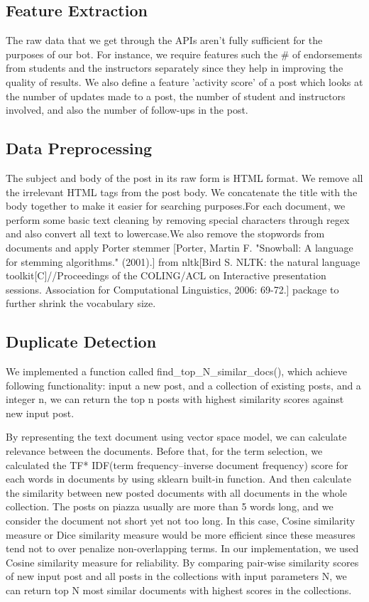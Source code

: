 \documentclass[sigconf]{acmart}
\begin{document}
\subsection{Feature Extraction}
The raw data that we get through the APIs aren't fully sufficient for the purposes of our bot. For instance, we require features such the \# of endorsements from students and the instructors separately since they help in improving the quality of results. We also define a feature 'activity score' of a post which looks at the number of updates made to a post, the number of student and instructors involved, and also the number of follow-ups in the post.


\subsection{Data Preprocessing}
The subject and body of the post in its raw form is HTML format. We remove all the irrelevant HTML tags from the post body. We concatenate the title with the body together to make it easier for searching purposes.For each document, we perform some basic text cleaning by removing special characters through regex and also convert all text to lowercase.We also remove the stopwords from documents and apply Porter stemmer [Porter, Martin F. "Snowball: A language for stemming algorithms." (2001).] from nltk[Bird S. NLTK: the natural language toolkit[C]//Proceedings of the COLING/ACL on Interactive presentation sessions. Association for Computational Linguistics, 2006: 69-72.] package to further shrink the vocabulary size. 

\subsection{Duplicate Detection}
We implemented a function called find\_top\_N\_similar\_docs(), which achieve following functionality: input a new post, and a collection of existing posts, and a integer n, we can return the top n posts with highest similarity scores against new input post. 

By representing the text document using vector space model, we can calculate relevance between the documents. Before that, for the term selection, we calculated the TF* IDF(term frequency–inverse document frequency) score for each words in documents by using sklearn built-in function. And then calculate the similarity between new posted documents with all documents in the whole collection. The posts on piazza usually are more than 5 words long, and we consider the document not short yet not too long. In this case, Cosine similarity measure or Dice similarity measure would be more efficient since these measures tend not to over penalize non-overlapping terms. In our implementation, we used Cosine similarity measure for reliability. By comparing pair-wise similarity scores of new input post and all posts in the collections  with input parameters N, we can return top N most similar documents with highest scores in the collections. 
\end{document}
